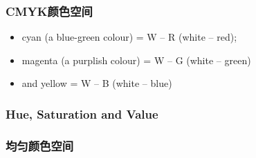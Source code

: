 \documentclass{beamer}
\newenvironment{itemizedot}{\begin{itemize} \renewcommand{\labelitemi}{$\bullet$}\renewcommand{\labelitemii}{$\bullet$}\renewcommand{\labelitemiii}{$\bullet$}\renewcommand{\labelitemiv}{$\bullet$}}{\end{itemize}}
\begin{document}
{{\begin{frame}
\end{frame}}{\begin{frame}
  \frametitle{CMYK颜色空间}
  \begin{itemizedot}
    \item cyan (a blue-green colour) = W -- R (white -- red);
    
    \item magenta (a purplish colour) = W -- G (white -- green)
    
    \item  and yellow = W -- B (white -- blue)
  \end{itemizedot}
\end{frame}}{\begin{frame}
  \frametitle{Hue, Saturation and Value}
  
  \qquad{}
\end{frame}}{\begin{frame}
  \frametitle{均匀颜色空间}
  

\end{frame}}}
\end{document}
